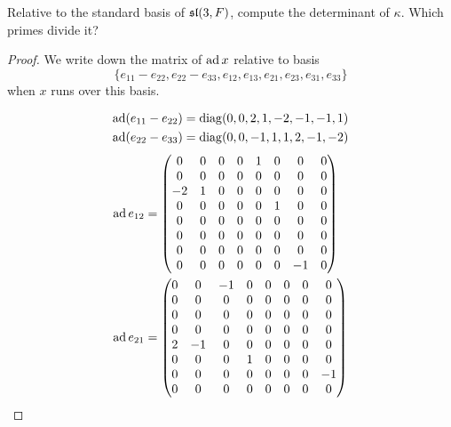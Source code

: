 \begin{ex}
  Relative to the standard basis of $\sl(3,F)$, compute the determinant of $\kappa$. Which primes divide it?
\end{ex}
\begin{proof}
  We write down the matrix of $\ad x$ relative to basis
  \begin{equation*}
  \{e_{11} - e_{22}, e_{22} - e_{33}, e_{12}, e_{13}, e_{21}, e_{23}, e_{31}, e_{33}\}
  \end{equation*}
  when $x$ runs over this basis.

  \begin{align*}
    \ad(e_{11} - e_{22}) &= \diag(0, 0, 2, 1,-2,-1,-1, 1) \\
    \ad(e_{22} - e_{33}) &= \diag(0, 0,-1, 1, 1, 2,-1,-2)
  \end{align*}
  \begin{align*}
    \ad e_{12} &= \begin{pmatrix}
                    0 & 0 & 0 & 0 & 1 & 0 & 0 & 0 \\
                    0 & 0 & 0 & 0 & 0 & 0 & 0 & 0 \\
                    -2 & 1 & 0 & 0 & 0 & 0 & 0 & 0 \\
                    0 & 0 & 0 & 0 & 0 & 1 & 0 & 0 \\
                    0 & 0 & 0 & 0 & 0 & 0 & 0 & 0 \\
                    0 & 0 & 0 & 0 & 0 & 0 & 0 & 0 \\
                    0 & 0 & 0 & 0 & 0 & 0 & 0 & 0 \\
                    0 & 0 & 0 & 0 & 0 & 0 & -1 & 0 \\
                  \end{pmatrix} \\
    \ad e_{21} &= \begin{pmatrix}
                    0 & 0 & -1 & 0 & 0 & 0 & 0 & 0 \\
                    0 & 0 & 0 & 0 & 0 & 0 & 0 & 0 \\
                    0 & 0 & 0 & 0 & 0 & 0 & 0 & 0 \\
                    0 & 0 & 0 & 0 & 0 & 0 & 0 & 0 \\
                    2 & -1 & 0 & 0 & 0 & 0 & 0 & 0 \\
                    0 & 0 & 0 & 1 & 0 & 0 & 0 & 0 \\
                    0 & 0 & 0 & 0 & 0 & 0 & 0 & -1 \\
                    0 & 0 & 0 & 0 & 0 & 0 & 0 & 0 \\

\end{pmatrix}
\end{align*}
\end{proof}
